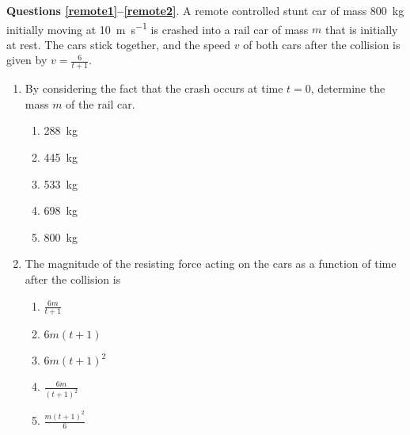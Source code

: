 \documentclass{../../../oss-classkick}
\begin{document}
\begin{multicols}{2}
\begin{enumerate}[resume,leftmargin=18pt]
  \end{enumerate}
  
  \textbf{Questions \ref{remote1}--\ref{remote2}}. A remote controlled stunt
  car of mass \SI{800}{\kilo\gram} initially moving at
  \SI{10}{\metre\per\second} is crashed into a rail car of mass $m$ that is
  initially at rest. The cars stick together, and the speed $v$ of both cars
  after the collision is given by $\displaystyle v=\frac{6}{t+1}$.

  \begin{enumerate}[resume,leftmargin=18pt]
  \item By considering the fact that the crash occurs at time $t=0$, determine
    the mass $m$ of the rail car.
    \label{remote1}
    \begin{enumerate}[nosep,leftmargin=18pt,label=(\Alph*)]
    \item\SI{288}{\kilo\gram}
    \item\SI{445}{\kilo\gram}
    \item\SI{533}{\kilo\gram}
    \item\SI{698}{\kilo\gram}
    \item\SI{800}{\kilo\gram}
    \end{enumerate}
    
  \item The magnitude of the resisting force acting on the cars as a function of
    time after the collision is
    \label{remote2}
    \begin{enumerate}[nosep,leftmargin=18pt,label=(\Alph*)]
    \item $\displaystyle \frac{6m}{t+1}$
    \item $6m(t+1)$
    \item $6m(t+1)^2$
    \item $\displaystyle\frac{6m}{(t+1)^2}$
    \item $\displaystyle\frac{m(t+1)^2}{6}$
    \end{enumerate}
    

\end{enumerate}
\end{multicols}
\end{document}
